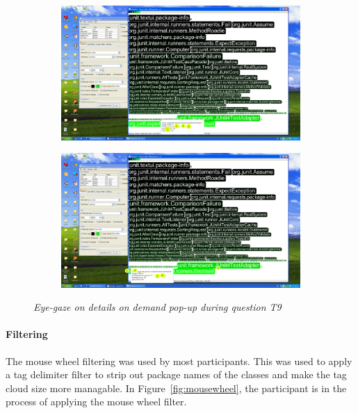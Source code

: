 \begin{figure}
	\centering
\begin{subfigure}{\textwidth}
	\centering
  \includegraphics[scale=0.27]{popup1.png}
\end{subfigure}
\begin{subfigure}{\textwidth}
	\centering
 \includegraphics[scale=0.27]{popup2.png}
\end{subfigure}
  \caption{\textit{Eye-gaze on details on demand pop-up during question T9}}
\label{fig:demandpopup}
\end{figure}

\paragraph{Filtering}

The mouse wheel filtering was used by most participants. This was used to apply a tag delimiter filter to strip out package names of the classes and make the tag cloud size more managable. In Figure~\vref{fig:mousewheel}, the participant is in the process of applying the mouse wheel filter.

